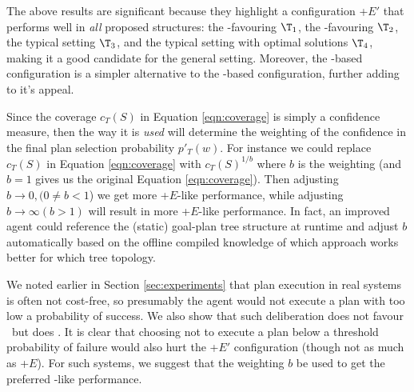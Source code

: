The above results are significant because they highlight a configuration \CL+$E'$ that performs well in \textit{all} proposed structures: the \CL-favouring $\T_1$, the \BUL-favouring $\T_2$, the typical setting $\T_3$, and the typical setting with optimal solutions $\T_4$, making it a good candidate for the general setting. Moreover, the \CL-based configuration is a simpler alternative to the \BUL-based configuration, further adding to it's appeal.

Since the
coverage $c_T(S)$ in Equation \ref{eqn:coverage} is simply a
confidence measure, then the way it is \textit{used} will determine
the weighting of the confidence in the final plan selection
probability $p'_T(w)$. For instance we could replace $c_T(S)$ in
Equation \ref{eqn:coverage} with $c_T(S)^{1/b}$ where $b$ is the
weighting (and $b=1$ gives us the original Equation
\ref{eqn:coverage}). Then adjusting $b \rightarrow 0, (0 \ne b < 1$)
we get more \BUL+$E$-like performance, while adjusting $b \rightarrow
\infty (b > 1)$ will result in more \CL+$E$-like performance. In fact,
an improved agent could reference the (static) goal-plan tree
structure at runtime and adjust $b$ automatically based on the offline
compiled knowledge of which approach works better for which tree
topology. 

We noted earlier in Section \ref{sec:experiments} that plan execution
in real systems is often not cost-free, so presumably the agent would
not execute a plan with too low a probability of success. We also show
that such deliberation does not favour \CL\ but does \BUL. It is clear
that choosing not to execute a plan below a threshold probability of
failure would also hurt the \CL+$E'$ configuration (though
not as much as \CL+$E$). For such systems, we suggest that the
weighting $b$ be used to get the preferred \BUL-like performance. 

